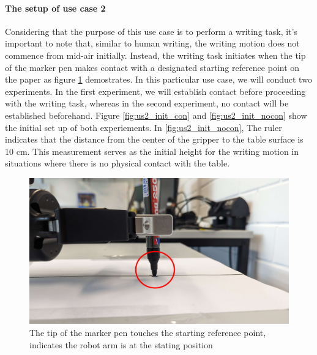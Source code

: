 \documentclass[report.tex]{subfiles}
\begin{document}
    \paragraph{\large{The setup of use case 2}\\}
    Considering that the purpose of this use case is to perform a writing task, it's important to note that, similar to human writing, the writing motion does not commence from mid-air initially. Instead, the writing task initiates when the tip of the marker pen makes contact with a designated starting reference point on the paper as figure \ref{fig:us2_pen} demostrates. In this particular use case, we will conduct two experiments. In the first experiment, we will establish contact before proceeding with the writing task, whereas in the second experiment, no contact will be established beforehand. Figure \ref{fig:us2_init_con} and \ref{fig:us2_init_nocon} show the initial set up of both experiements. In \ref{fig:us2_init_nocon}, The ruler indicates that the distance from the center of the gripper to the table surface is 10 cm. This measurement serves as the initial height for the writing motion in situations where there is no physical contact with the table.
    \begin{figure}[!h]
        \centering
        \captionsetup[figure]{justification=centering}
        \includegraphics[width=0.9\linewidth]{images/us2_starting_circle.jpg}
        \caption{The tip of the marker pen touches the starting reference point, indicates the robot arm is at the stating position}
        \label{fig:us2_pen}
    \end{figure}
\end{document}
